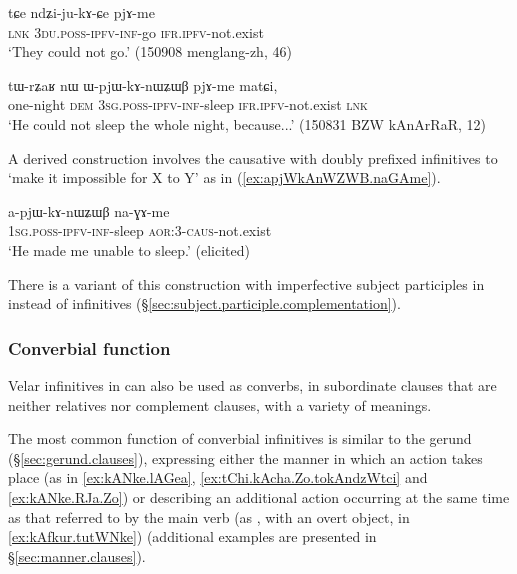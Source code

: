 \begin{exe}
\ex \label{ex:ndZijukACe}
\gll tɕe ndʑi-ju-kɤ-ɕe pjɤ-me \\
\textsc{lnk} \textsc{3du}.\textsc{poss}-\textsc{ipfv}-\textsc{inf}-go \textsc{ifr}.\textsc{ipfv}-not.exist \\
\glt `They could not go.' (150908 menglang-zh, 46)
\end{exe}

\begin{exe}
\ex \label{ex:WpjWkAnWZWB}
\gll tɯ-rʑaʁ nɯ ɯ-pjɯ-kɤ-nɯʑɯβ pjɤ-me matɕi, \\
one-night \textsc{dem} \textsc{3sg}.\textsc{poss}-\textsc{ipfv}-\textsc{inf}-sleep \textsc{ifr}.\textsc{ipfv}-not.exist \textsc{lnk} \\
\glt `He could not sleep the whole night, because...' (150831 BZW kAnArRaR, 12)
\end{exe}

A derived construction involves the causative  with doubly prefixed infinitives to `make it impossible for X to Y' as in (\ref{ex:apjWkAnWZWB.naGAme}).

\begin{exe}
\ex \label{ex:apjWkAnWZWB.naGAme}
\gll a-pjɯ-kɤ-nɯʑɯβ na-ɣɤ-me \\
\textsc{1sg}.\textsc{poss}-\textsc{ipfv}-\textsc{inf}-sleep \textsc{aor}:3\flobv{}-\textsc{caus}-not.exist \\
\glt `He made me unable to sleep.' (elicited)
\end{exe}

There is a variant of this construction with imperfective subject participles in  instead of infinitives (§\ref{sec:subject.participle.complementation}). 

\subsubsection{Converbial function}    \label{sec:inf.converb}
Velar infinitives in  can also be used as converbs, in subordinate clauses that are neither relatives nor complement clauses, with a variety of meanings.

The most common function of converbial infinitives is similar to the gerund (§\ref{sec:gerund.clauses}), expressing either the manner in which an action takes place (as in \ref{ex:kANke.lAGea}, \ref{ex:tChi.kAcha.Zo.tokAndzWtci} and \ref{ex:kANke.RJa.Zo}) or describing an additional action occurring at the same time as that referred to by the main verb (as , with an overt object, in \ref{ex:kAfkur.tutWNke}) (additional examples are presented in §\ref{sec:manner.clauses}).

